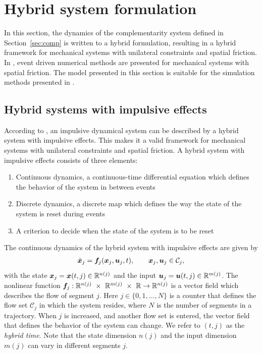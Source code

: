 \documentclass[../DC2019003Bouma.tex]{subfiles}
\begin{document}
\section{Hybrid system formulation}
In this section, the dynamics of the complementarity system defined in Section~\ref{sec:comp} is written to a hybrid formulation, resulting in a hybrid framework for mechanical systems with unilateral constraints and spatial friction. In \cite[p. 222]{Acary2008}, event driven numerical methods are presented for mechanical systems with spatial friction. The model presented in this section is suitable for the simulation methods presented in \cite{Acary2008}.

%
\subsection{Hybrid systems with impulsive effects}\label{sec:2hyb}
According to \cite{Haddad2006}, an impulsive dynamical system can be described by a hybrid system with impulsive effects. This makes it a valid framework for mechanical systems with unilateral constraints and spatial friction. A hybrid system with impulsive effects consists of three elements:
\begin{enumerate}
\item Continuous dynamics, a continuous-time differential equation which defines the behavior of the system in between events
\item Discrete dynamics, a discrete map which defines the way the state of the system is reset during events
\item A criterion to decide when the state of the system is to be reset
\end{enumerate}

The continuous dynamics of the hybrid system with impulsive effects are given by
\begin{align}
\dot{{\boldsymbol{x}}}_j ={\boldsymbol{f}}_j({\boldsymbol{x}}_j,{\boldsymbol{u}}_j,t), \qquad{\boldsymbol{x}}_j,{\boldsymbol{u}}_j\in \mathcal{C}_j,\label{eq:hybimp1}
\end{align}
with the state ${\boldsymbol{x}}_j = {\boldsymbol{x}}(t,j)\in\mathbb{R}^{n(j)}$ and the input ${\boldsymbol{u}}_j = {\boldsymbol{u}}(t,j)\in\mathbb{R}^{m(j)}$. The nonlinear function $\fb_j:\Rbb^{n(j)}\ \times\ \Rbb^{m(j)}\ \times\ \Rbb\rightarrow \Rbb^{n(j)}$ is a vector field which describes the flow of segment $j$. Here $j\in\{0,1,\dots,N\}$ is a counter that defines the flow set $\mathcal{C}_j$ in which the system resides, where $N$ is the number of segments in a trajectory. When $j$ is increased, and another flow set is entered, the vector field that defines the behavior of the system can change. We refer to $(t,j)$ as the \textit{hybrid time}. Note that the state dimension $n(j)$ and the input dimension $m(j)$ can vary in different segments $j$.
\end{document}
